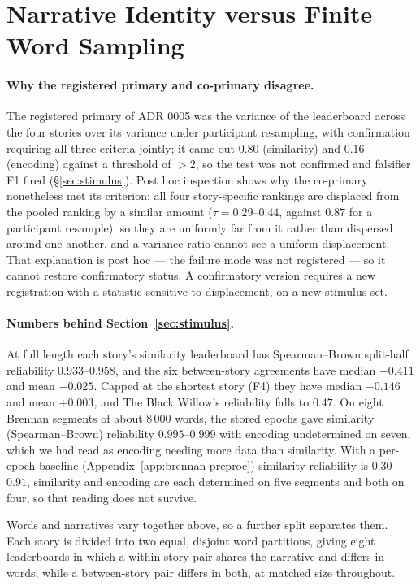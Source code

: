 \documentclass{article}
\newcounter{none}
\begin{document}
\section{Narrative Identity versus Finite Word Sampling}\label{sec:partition}

\paragraph{Why the registered primary and co-primary disagree.} The registered primary of ADR 0005
was the variance of the leaderboard across the four stories over its variance under participant
resampling, with confirmation requiring all three criteria jointly; it came out $0.80$
(similarity) and $0.16$ (encoding) against a threshold of $>2$, so the test was not confirmed and
falsifier F1 fired (\S\ref{sec:stimulus}). Post hoc inspection shows why the co-primary
nonetheless met its criterion: all four story-specific rankings are displaced from the pooled
ranking by a similar amount ($\tau = 0.29$--$0.44$, against $0.87$ for a participant resample), so
they are uniformly far from it rather than dispersed around one another, and a variance ratio
cannot see a uniform displacement. That explanation is post hoc --- the failure mode was not
registered --- so it cannot restore confirmatory status. A confirmatory version requires a new
registration with a statistic sensitive to displacement, on a new stimulus set.

\paragraph{Numbers behind Section~\ref{sec:stimulus}.} At full length each story's similarity
leaderboard has Spearman--Brown split-half reliability $0.933$--$0.958$, and the six between-story
agreements have median $-0.411$ and mean $-0.025$. Capped at the shortest story (F4) they have
median $-0.146$ and mean $+0.003$, and The Black Willow's reliability falls to $0.47$. On eight
Brennan segments of about $8\,000$ words, the stored epochs gave similarity (Spearman--Brown)
reliability $0.995$--$0.999$ with encoding undetermined on seven, which we had read as encoding needing
more data than similarity. With a per-epoch baseline (Appendix~\ref{app:brennan-preproc}) similarity
reliability is $0.30$--$0.91$, similarity and encoding are each determined on five segments and both
on four, so that reading does not survive.

Words and narratives vary together above, so a further split separates them. Each story is divided
into two equal, disjoint word partitions, giving eight leaderboards in which a within-story pair
shares the narrative and differs in words, while a between-story pair differs in both, at matched
size throughout.
\end{document}
